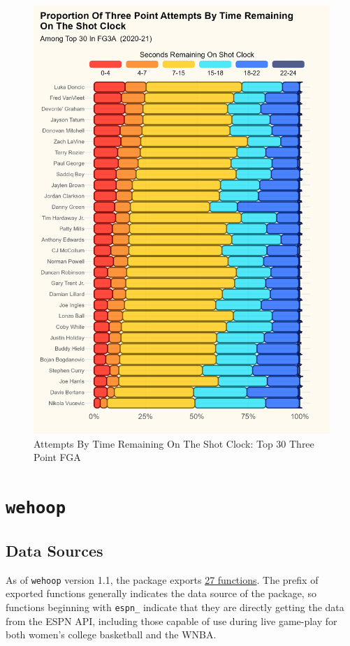 \documentclass[12pt]{article}
\begin{document}
\begin{figure}[htbp]
    \centering
    \caption{Attempts By Time Remaining On The Shot Clock: Top 30 Three Point FGA}
    \centering
    \includegraphics{./figures/hoopR_chicklet.png}
    
\end{figure}
\newpage
\section{\texttt{wehoop}}
\subsection{Data Sources}
As of \texttt{wehoop} version 1.1, the package exports \href{https://saiemgilani.github.io/wehoop/reference/index.html}{27 functions}. The prefix of exported functions generally indicates the data source of the package, so functions beginning with \texttt{espn\_} indicate that they are directly getting the data from the ESPN API, including those capable of use during live game-play for both women's college basketball and the WNBA.  
\end{document}
